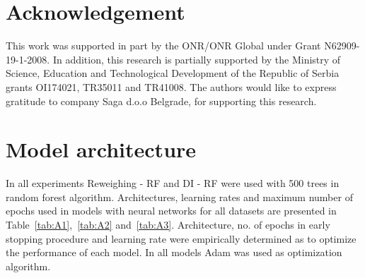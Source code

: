 \documentclass[preprint,12pt]{elsarticle}
\begin{document}
\section*{Acknowledgement}
This work was supported in part by the ONR/ONR Global under Grant N62909-19-1-2008. In addition, this research is partially supported by the Ministry of Science, Education and Technological Development of the Republic of Serbia grants OI174021, TR35011 and TR41008. The authors would like to express gratitude to company Saga d.o.o Belgrade, for supporting this research.




\appendix

\section{Model architecture}
\label{app:Architecture}

In all experiments Reweighing - RF and DI - RF were used with 500 trees in random forest algorithm. Architectures, learning rates and maximum number of epochs used in models with neural networks for all datasets are presented in Table~\ref{tab:A1},~\ref{tab:A2} and~\ref{tab:A3}. Architecture, no. of epochs in early stopping procedure and learning rate were empirically determined as to optimize the performance of each model. In all models Adam was used as optimization algorithm. 
\end{document}
